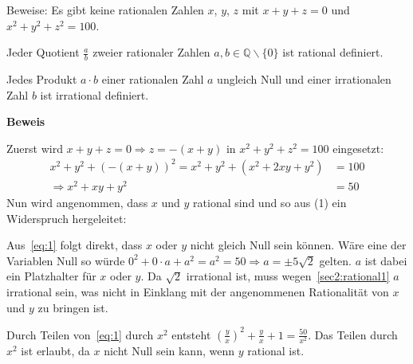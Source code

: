 \documentclass[10pt, a4paper, reqno]{amsart}
\makeatletter
\renewcommand\proofname{Beweis}
\renewenvironment{proof}[1][\proofname]{\par
\pushQED{\qed}%
\normalfont \topsep6\p@\@plus6\p@\relax
\trivlist
\item\relax
{\bfseries#1}\hspace\labelsep\ignorespaces
}{%
\popQED\endtrivlist\@endpefalse
}
\makeatother
\begin{document}
\newpage
\begin{aufgabe}
  Beweise: Es gibt keine rationalen Zahlen $x$, $y$, $z$ mit $x + y + z = 0$ und
  $x^2 + y^2 + z^2 = 100$.
\end{aufgabe}
\begin{lemma}\label{sec2:rational1}
  Jeder Quotient $\frac{a}{b}$ zweier rationaler Zahlen $a,b∈ℚ\backslash\{0\}$
  ist rational definiert.
\end{lemma}
\begin{lemma}\label{sec2:rational2}
  Jedes Produkt $ a\cdot b $ einer rationalen Zahl $a$ ungleich Null und einer
  irrationalen Zahl $b$ ist irrational definiert.
\end{lemma}
\begin{proof}
  Zuerst wird $x+y+z = 0 \Rightarrow z = -(x+y)$ in $x^2+y^2+z^2 = 100$
  eingesetzt:
  \begin{equation}
    \label{eq:1}
    \begin{split}
      x^2+y^2+(-(x+y))^2 = x^2+y^2+(x^2+2xy+y^2) &= 100\\
      \Rightarrow x^2+xy+y^2&=50
    \end{split}
  \end{equation}
  Nun wird angenommen, dass $x$ und $y$ rational sind und so aus (1) ein Widerspruch hergeleitet:

  Aus~\eqref{eq:1} folgt direkt, dass $x$ oder $y$ nicht gleich Null sein können. Wäre eine der Variablen
  Null so würde $0^2+0\cdot a+a^2=a^2=50\Rightarrow a = \pm5\sqrt{2}$ gelten. $a$ ist
  dabei ein Platzhalter für $x$ oder $y$. Da $\sqrt{2}$ irrational ist, muss
  wegen~\autoref{sec2:rational1} $a$ irrational sein, was nicht in Einklang mit
  der angenommenen Rationalität von $x$ und $y$ zu bringen ist.
  
  Durch Teilen von~\eqref{eq:1} durch $x^2$ entsteht
  $(\frac{y}{x})^2+\frac{y}{x}+1=\frac{50}{x^2}$. Das Teilen durch $x^2$ ist
  erlaubt, da $x$ nicht Null sein kann, wenn $y$ rational ist.
  

\end{proof}
\end{document}

